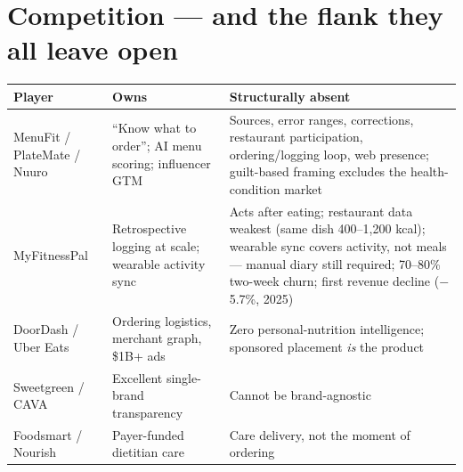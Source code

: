 \documentclass[10pt]{article}
\begin{document}
\section{Competition --- and the flank they all leave open}

\begin{tabularx}{\textwidth}{@{}>{\raggedright\arraybackslash}p{3.4cm} >{\raggedright\arraybackslash}p{4.3cm} L@{}}
\toprule
\textbf{Player} & \textbf{Owns} & \textbf{Structurally absent}\\
\midrule
MenuFit / PlateMate / Nuuro & ``Know what to order''; AI menu scoring; influencer GTM & Sources, error ranges, corrections, restaurant participation, ordering/logging loop, web presence; guilt-based framing excludes the health-condition market\\
MyFitnessPal & Retrospective logging at scale; wearable activity sync & Acts after eating; restaurant data weakest (same dish 400--1,200 kcal); wearable sync covers activity, not meals --- manual diary still required; 70--80\% two-week churn; first revenue decline ($-$5.7\%, 2025)\\
DoorDash / Uber Eats & Ordering logistics, merchant graph, \$1B+ ads & Zero personal-nutrition intelligence; sponsored placement \emph{is} the product\\
Sweetgreen / CAVA & Excellent single-brand transparency & Cannot be brand-agnostic\\
Foodsmart / Nourish & Payer-funded dietitian care & Care delivery, not the moment of ordering\\
\bottomrule
\end{tabularx}
\end{document}
